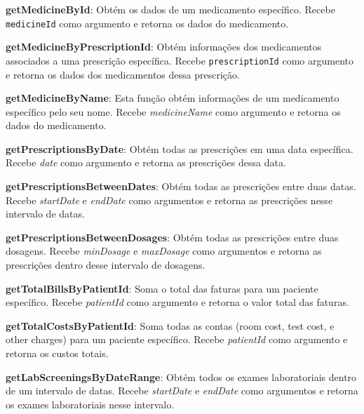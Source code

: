 \textbf{getMedicineById}: Obtém os dados de um medicamento específico. Recebe \texttt{medicineId} como argumento e retorna os dados do medicamento.

\vspace{0.15cm}

\textbf{getMedicineByPrescriptionId}: Obtém informações dos medicamentos associados a uma prescrição específica. Recebe \texttt{prescriptionId} como argumento e retorna os dados dos medicamentos dessa prescrição.

\vspace{0.15cm}

\textbf{getMedicineByName}: Esta função obtém informações de um medicamento específico pelo seu nome. Recebe \textit{medicineName} como argumento e retorna os dados do medicamento.

\vspace{0.15cm}

\textbf{getPrescriptionsByDate}: Obtém todas as prescrições em uma data específica. Recebe \textit{date} como argumento e retorna as prescrições dessa data.

\vspace{0.15cm}

\textbf{getPrescriptionsBetweenDates}: Obtém todas as prescrições entre duas datas. Recebe \textit{startDate} e \textit{endDate} como argumentos e retorna as prescrições nesse intervalo de datas.

\vspace{0.15cm}

\textbf{getPrescriptionsBetweenDosages}: Obtém todas as prescrições entre duas dosagens. Recebe \textit{minDosage} e \textit{maxDosage} como argumentos e retorna as prescrições dentro desse intervalo de dosagens.

\vspace{0.15cm}

\textbf{getTotalBillsByPatientId}: Soma o total das faturas para um paciente específico. Recebe \textit{patientId} como argumento e retorna o valor total das faturas.

\vspace{0.15cm}

\textbf{getTotalCostsByPatientId}: Soma todas as contas (room cost, test cost, e other charges) para um paciente específico. Recebe \textit{patientId} como argumento e retorna os custos totais.

\vspace{0.15cm}

\textbf{getLabScreeningsByDateRange}: Obtém todos os exames laboratoriais dentro de um intervalo de datas. Recebe \textit{startDate} e \textit{endDate} como argumentos e retorna os exames laboratoriais nesse intervalo.

